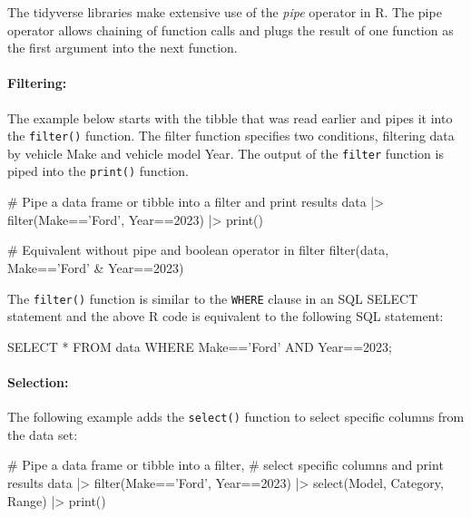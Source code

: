 The tidyverse libraries make extensive use of the \emph{pipe} operator in R. The pipe operator allows chaining of function calls and plugs the result of one function as the first argument into the next function. 

\paragraph*{Filtering:} The example below starts with the tibble that was read earlier and pipes it into the \texttt{filter()} function. The filter function specifies two conditions, filtering data by vehicle Make and vehicle model Year. The output of the \texttt{filter} function is piped into the \texttt{print()} function. 

\begin{samepage}
\begin{Rcode}
# Pipe a data frame or tibble into a filter and print results
data |> 
  filter(Make=='Ford', Year==2023) |> 
  print()

# Equivalent without pipe and boolean operator in filter
filter(data, Make=='Ford' & Year==2023)
\end{Rcode}
\end{samepage}

The \texttt{filter()} function is similar to the \texttt{WHERE} clause in an SQL SELECT statement and the above R code is equivalent to the following SQL statement:

\begin{samepage}
\begin{sqlcode}
SELECT * 
   FROM data 
   WHERE Make=='Ford' AND Year==2023;
\end{sqlcode}
\end{samepage}

\paragraph*{Selection:} The following example adds the \texttt{select()} function to select specific columns from the data set:

\begin{samepage}
\begin{Rcode}
# Pipe a data frame or tibble into a filter,
# select specific columns and print results
data |> 
  filter(Make=='Ford', Year==2023) |> 
  select(Model, Category, Range) |>
  print()
\end{Rcode}
\end{samepage}


